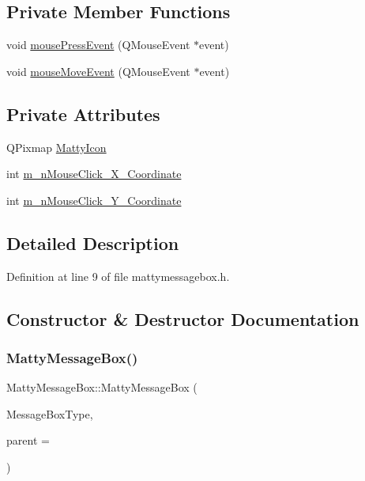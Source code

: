 \subsection*{Private Member Functions}
\begin{DoxyCompactItemize}
\item 
void \hyperlink{classMattyMessageBox_a9f466cebc32e2bcf238c63a15c788778}{mouse\+Press\+Event} (Q\+Mouse\+Event $\ast$event)
\item 
void \hyperlink{classMattyMessageBox_ad8a35df269ef14ea29c68cd9faa1ffeb}{mouse\+Move\+Event} (Q\+Mouse\+Event $\ast$event)
\end{DoxyCompactItemize}
\subsection*{Private Attributes}
\begin{DoxyCompactItemize}
\item 
Q\+Pixmap \hyperlink{classMattyMessageBox_acd535bd7bec5cf024ea72146a0cbc4b6}{Matty\+Icon}
\item 
int \hyperlink{classMattyMessageBox_ad3676e7eb43e10f71b8e48855f55bcc8}{m\+\_\+n\+Mouse\+Click\+\_\+\+X\+\_\+\+Coordinate}
\item 
int \hyperlink{classMattyMessageBox_abe066f7b4122bd9dcb602661ec318302}{m\+\_\+n\+Mouse\+Click\+\_\+\+Y\+\_\+\+Coordinate}
\end{DoxyCompactItemize}


\subsection{Detailed Description}


Definition at line 9 of file mattymessagebox.\+h.



\subsection{Constructor \& Destructor Documentation}
\hypertarget{classMattyMessageBox_a7690be6e7b2f25d397ce8c6a7cf067a4}{}\label{classMattyMessageBox_a7690be6e7b2f25d397ce8c6a7cf067a4} 
\subsubsection{\texorpdfstring{Matty\+Message\+Box()}{MattyMessageBox()}}
{\footnotesize\ttfamily Matty\+Message\+Box\+::\+Matty\+Message\+Box (\begin{DoxyParamCaption}\item[{\hyperlink{mattymessagebox_8h_a1d1cfd8ffb84e947f82999c682b666a7}{Type}}]{Message\+Box\+Type,  }\item[{Q\+Widget $\ast$}]{parent = {} }\end{DoxyParamCaption})}



